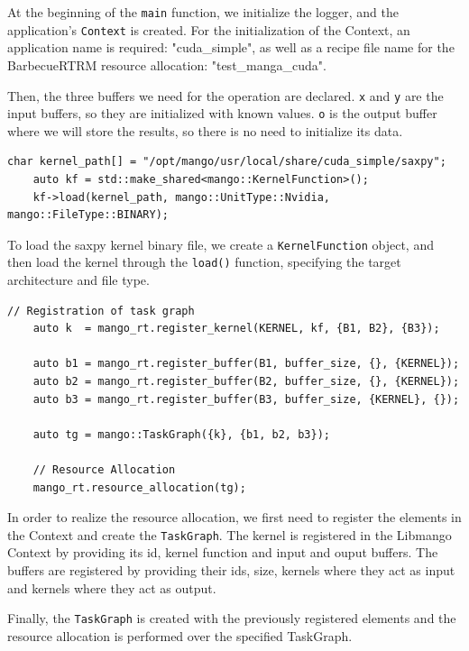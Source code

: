 At the beginning of the \texttt{main} function, we initialize the logger, and the application's \texttt{Context} is created. For the initialization of the Context, an application name is required: "cuda\_simple", as well as a recipe file name for the BarbecueRTRM resource allocation: "test\_manga\_cuda".

Then, the three buffers we need for the operation are declared. \texttt{x} and \texttt{y} are the input buffers, so they are initialized with known values. \texttt{o} is the output buffer where we will store the results, so there is no need to initialize its data.

\begin{lstlisting}[style=CStyle, caption=Sample - Kernel loading]
    char kernel_path[] = "/opt/mango/usr/local/share/cuda_simple/saxpy";
    auto kf = std::make_shared<mango::KernelFunction>();
    kf->load(kernel_path, mango::UnitType::Nvidia, mango::FileType::BINARY);
\end{lstlisting}

To load the saxpy kernel binary file, we create a \texttt{KernelFunction} object, and then load the kernel through the \texttt{load()} function, specifying the target architecture and file type.

\begin{lstlisting}[style=CStyle, caption=Sample - TaskGraph registration and resource allocation]
    // Registration of task graph
    auto k  = mango_rt.register_kernel(KERNEL, kf, {B1, B2}, {B3});

    auto b1 = mango_rt.register_buffer(B1, buffer_size, {}, {KERNEL});
    auto b2 = mango_rt.register_buffer(B2, buffer_size, {}, {KERNEL});
    auto b3 = mango_rt.register_buffer(B3, buffer_size, {KERNEL}, {});

    auto tg = mango::TaskGraph({k}, {b1, b2, b3});

    // Resource Allocation
    mango_rt.resource_allocation(tg);
\end{lstlisting}

In order to realize the resource allocation, we first need to register the elements in the Context and create the \texttt{TaskGraph}.
The kernel is registered in the Libmango Context by providing its id, kernel function and input and ouput buffers.
The buffers are registered by providing their ids, size, kernels where they act as input and kernels where they act as output.

Finally, the \texttt{TaskGraph} is created with the previously registered elements and the resource allocation is performed over the specified TaskGraph.

